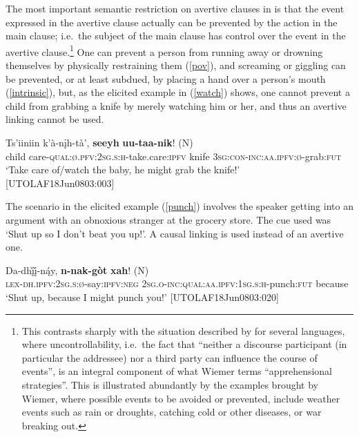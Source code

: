 \documentclass[output=paper,colorlinks,citecolor=brown]{langscibook}
\begin{document}
The most important semantic restriction on avertive clauses in  is that the event expressed in the avertive clause actually can be prevented by the action in the main clause; i.e.\  the subject of the main clause has control over the event in the avertive clause.\footnote{This contrasts sharply with the situation described by \citet{chapters/wiemer} for several  languages, where uncontrollability, i.e.\  the fact that ``neither a discourse participant (in particular the addressee) nor a third party can influence the course of events'', is an integral component of what Wiemer terms ``apprehensional strategies''. This is illustrated abundantly by the examples brought by Wiemer, where possible events to be avoided or prevented, include weather events such as rain or droughts, catching cold or other diseases, or war breaking out.} One can prevent a person from running away or drowning themselves by physically restraining them (\ref{pov}), and screaming or giggling can be prevented, or at least subdued, by placing a hand over a person's mouth (\ref{intrinsic}), but, as the elicited example in (\ref{watch}) shows, one cannot prevent a child from grabbing a knife by merely watching him or her, and thus an avertive linking cannot be used.

\ea
\label{watch}
\gll Ts'iiniin k'à-nįh-tà', \textbf{seeyh} {\textbf{uu-taa-nik}! \textnormal{(N)}} \\
child care-\textsc{qual:ø.pfv:2sg.s:h}-take.care:\textsc{ipfv} knife \textsc{3sg:con-inc:aa.ipfv:ø}-grab:\textsc{fut} \\
\glt `Take care of/watch the baby, he might grab the knife!' \\ \hfill [UTOLAF18Jun0803:003]
\z 

The scenario in the elicited example (\ref{punch}) involves the speaker getting into an argument with an obnoxious stranger at the grocery store. The cue used was `Shut up so I don't beat you up!'. A causal linking is used instead of an avertive one.

\ea \label{punch}
\gll Da-dhį̀į̀-ną́y, \textbf{n-nak-gòt} {\textbf{xah}! \textnormal{(N)}} \\
\textsc{lex-dh.ipfv:2sg.s:ø}-say:\textsc{ipfv:neg} \textsc{2sg.o-inc:qual:aa.ipfv:1sg.s:h}-punch:\textsc{fut} because \\
\glt `Shut up, because I might punch you!' \hfill [UTOLAF18Jun0803:020]
\z
\end{document}
